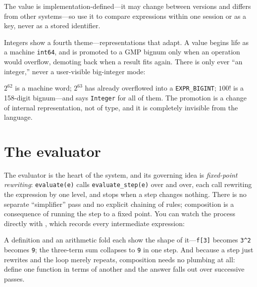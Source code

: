 \begin{codepairs}
\end{codepairs}

\noindent
The value is implementation-defined---it may change between versions and differs from
other systems---so use it to compare expressions within one session or as a key, never
as a stored identifier.


Integers show a fourth theme---representations that adapt. A value begins life as a
machine \texttt{int64}, and is promoted to a GMP bignum only when an operation would
overflow, demoting back when a result fits again. There is only ever ``an integer,''
never a user-visible big-integer mode:


\(2^{62}\) is a machine word; \(2^{63}\) has already overflowed into a
\texttt{EXPR\_BIGINT}; \(100!\) is a 158-digit bignum---and  says
\texttt{Integer} for all of them. The promotion is a change of internal
representation, not of type, and it is completely invisible from the language.

\section{The evaluator}
\label{sec:int-eval}

The evaluator is the heart of the system, and its governing idea is
\emph{fixed-point rewriting}: \texttt{evaluate(e)} calls \texttt{evaluate\_step(e)}
over and over, each call rewriting the expression by one level, and stops when a step
changes nothing. There is no separate ``simplifier'' pass and no explicit chaining of
rules; composition is a consequence of running the step to a fixed point. You can
watch the process directly with , which records every intermediate expression:


A definition and an arithmetic fold each show the shape of it---\texttt{f[3]} becomes
\texttt{3\^{}2} becomes \texttt{9}; the three-term sum collapses to \texttt{9} in one
step. And because a step just rewrites and the loop merely repeats, composition needs
no plumbing at all: define one function in terms of another and the answer falls out
over successive passes.

